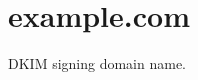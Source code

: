 \hypertarget{example_8com-example}{}\section{example.\+com}
D\+K\+IM signing domain name. \textquotesingle{}


\begin{DoxyCodeInclude}
\end{DoxyCodeInclude}
 